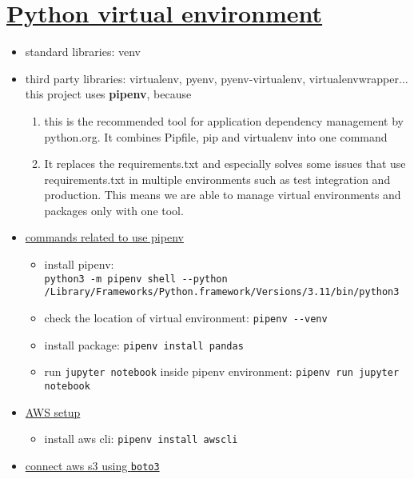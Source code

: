 \documentclass{article}
\begin{document}
\section{\href{https://stackoverflow.com/questions/41573587/what-is-the-difference-between-venv-pyvenv-pyenv-virtualenv-virtualenvwrappe}{Python virtual environment}}
\begin{itemize}
\item standard libraries: venv
\item third party libraries: virtualenv, pyenv, pyenv-virtualenv, virtualenvwrapper...\\
this project uses \textbf{pipenv}, because 
	\begin{enumerate}
		\item this is the recommended tool for application dependency management by python.org. It combines Pipfile, pip and virtualenv into one command
		\item It replaces the requirements.txt and especially solves some issues
that use requirements.txt in multiple environments such as test integration and production. This means we are able to manage virtual environments and packages only with one tool.
	\end{enumerate}
\item \href{https://levelup.gitconnected.com/beginners-guide-to-pipenv-9340a6c35147}{commands related to use pipenv}
	\begin{itemize}
		\item install pipenv: \\\verb|python3 -m pipenv shell --python /Library/Frameworks/Python.framework/Versions/3.11/bin/python3|
		\item check the location of virtual environment: \verb|pipenv --venv|
		\item install package: \verb|pipenv install pandas|
		\item run \verb|jupyter notebook| inside pipenv environment:
		\verb|pipenv run jupyter notebook|
	\end{itemize}
\item \href{https://geekflare.com/aws-s3-command-examples/}{AWS setup}
	\begin{itemize}
		\item install aws cli: \verb|pipenv install awscli|
	\end{itemize}
\item \href{https://towardsdatascience.com/introduction-to-pythons-boto3-c5ac2a86bb63}{connect aws s3 using \texttt{boto3}}
	\begin{itemize}

\end{itemize}
\end{itemize}
\end{document}
